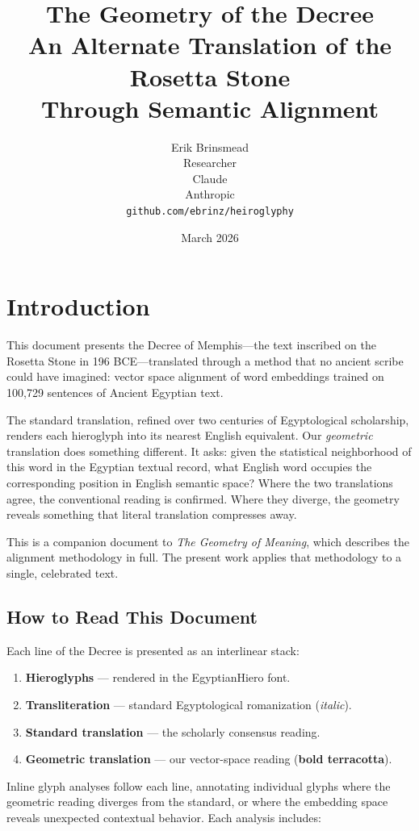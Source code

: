 \documentclass[11pt, a4paper]{article}
\title{
    \textbf{The Geometry of the Decree}\\[6pt]
    {\large An Alternate Translation of the Rosetta Stone\\Through Semantic Alignment}
}
\author{
    Erik Brinsmead \\
    Researcher \\[6pt]
    Claude \\
    Anthropic \\[12pt]
    \texttt{github.com/ebrinz/heiroglyphy}
}
\date{March 2026}
\begin{document}
\maketitle

\section{Introduction}
\label{sec:intro}

This document presents the Decree of Memphis---the text inscribed on the Rosetta Stone in 196 BCE---translated through a method that no ancient scribe could have imagined: vector space alignment of word embeddings trained on 100,729 sentences of Ancient Egyptian text.

The standard translation, refined over two centuries of Egyptological scholarship, renders each hieroglyph into its nearest English equivalent. Our \textit{geometric} translation does something different. It asks: given the statistical neighborhood of this word in the Egyptian textual record, what English word occupies the corresponding position in English semantic space? Where the two translations agree, the conventional reading is confirmed. Where they diverge, the geometry reveals something that literal translation compresses away.

This is a companion document to \textit{The Geometry of Meaning}, which describes the alignment methodology in full. The present work applies that methodology to a single, celebrated text.

\subsection{How to Read This Document}

Each line of the Decree is presented as an interlinear stack:

\begin{enumerate}[nosep]
    \item \textbf{Hieroglyphs} --- rendered in the EgyptianHiero font.
    \item \textbf{Transliteration} --- standard Egyptological romanization (\textit{italic}).
    \item \textbf{Standard translation} --- the scholarly consensus reading.
    \item {\bfseries\color{rosetta}Geometric translation} --- our vector-space reading (\textbf{bold terracotta}).
\end{enumerate}

Inline glyph analyses follow each line, annotating individual glyphs where the geometric reading diverges from the standard, or where the embedding space reveals unexpected contextual behavior. Each analysis includes:
\end{document}
